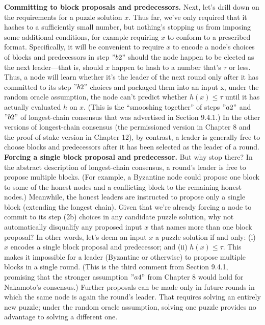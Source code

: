 \noindent
\textbf{Committing to block proposals and predecessors.} Next, let’s drill down on the requirements for a puzzle solution $x$. Thus far, we've only required that it hashes to a sufficiently small number, but nothing’s stopping us from imposing some additional conditions,
for example requiring $x$ to conform to a prescribed format. Specifically, it will be convenient
to require $x$ to encode a node’s choices of blocks and predecessors in step $"b2"$ should the
node happen to be elected as the next leader—that is, should $x$ happen to hash to a number
that’s $\tau$ or less. Thus, a node will learn whether it’s the leader of the next round only after
it has committed to its step $"b2"$ choices and packaged them into an input x, under the
random oracle assumption, the node can’t predict whether $h(x) \leq \tau$ until it has actually
evaluated $h$ on $x$. (This is the “smooshing together” of steps $"a2"$ and $"b2"$ of longest-chain
consensus that was advertised in Section 9.4.1.) In the other versions of longest-chain consensus (the permissioned version in Chapter 8 and the proof-of-stake version in Chapter 12), by contrast, a leader is generally free to choose blocks and predecessors after it has been
selected as the leader of a round.\\

\noindent
\textbf{Forcing a single block proposal and predecessor.} But why stop there? In the abstract
description of longest-chain consensus, a round’s leader is free to propose multiple blocks.
(For example, a Byzantine node could propose one block to some of the honest nodes and a
conflicting block to the remaining honest nodes.) Meanwhile, the honest leaders are instructed
to propose only a single block (extending the longest chain). Given that we’re already
forcing a node to commit to its step (2b) choices in any candidate puzzle solution, why not
automatically disqualify any proposed input $x$ that names more than one block proposal?
In other words, let’s deem an input $x$ a puzzle solution if and only: (i) $x$ encodes a single
block proposal and predecessor; and (ii) $h(x) \leq \tau$. This makes it impossible for a leader
(Byzantine or otherwise) to propose multiple blocks in a single round. (This is the third
comment from Section 9.4.1, promising that the stronger assumption $"a4"$ from Chapter 8 would hold for Nakamoto's consensus.) Further proposals can be made only in future rounds
in which the same node is again the round’s leader. That requires solving an entirely new
puzzle; under the random oracle assumption, solving one puzzle provides no advantage to
solving a different one.\\

